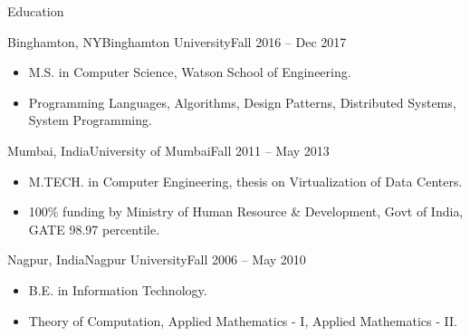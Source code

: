 \documentclass[]{mcdowellcv}
\begin{document}
	\vspace*{-3mm}
	\begin{cvsection}{Education}
		\begin{cvsubsection}{Binghamton, NY}{Binghamton University}{Fall 2016 -- Dec 2017}
			\begin{itemize}
				\item M.S. in Computer Science, Watson School of Engineering.
				\item Programming Languages, Algorithms, Design Patterns, Distributed Systems, System Programming. 
			\end{itemize}
		\end{cvsubsection}

		\begin{cvsubsection}{Mumbai, India}{University of Mumbai}{Fall 2011 -- May 2013}
			\begin{itemize}
				\item M.TECH. in Computer Engineering, thesis on Virtualization of Data Centers.
				\item 100\% funding by Ministry of Human Resource \& Development, Govt of India, GATE 98.97 percentile. 
			\end{itemize}
		\end{cvsubsection}

		\begin{cvsubsection}{Nagpur, India}{Nagpur University}{Fall 2006 -- May 2010}
			\begin{itemize}
				\item B.E. in Information Technology.
				\item Theory of Computation, Applied Mathematics - I, Applied Mathematics - II.
			\end{itemize}
		\end{cvsubsection}
	\end{cvsection}
	\vspace*{-3mm}
\end{document}
